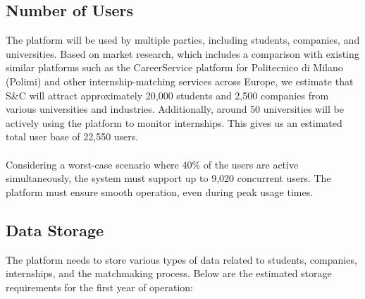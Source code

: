 \subsection{Number of Users}
The platform will be used by multiple parties, including students, companies, and universities. Based on market research, which includes a comparison with existing similar platforms such as the CareerService platform for Politecnico di Milano (Polimi) and other internship-matching services across Europe, we estimate that S\&C will attract approximately 20,000 students and 2,500 companies from various universities and industries. Additionally, around 50 universities will be actively using the platform to monitor internships. This gives us an estimated total user base of 22,550 users.\\ \\
Considering a worst-case scenario where 40\% of the users are active simultaneously, the system must support up to 9,020 concurrent users. The platform must ensure smooth operation, even during peak usage times.

\subsection{Data Storage}
The platform needs to store various types of data related to students, companies, internships, and the matchmaking process. Below are the estimated storage requirements for the first year of operation:

